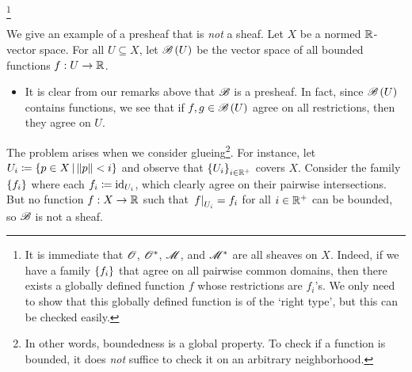 \documentclass[../Moduli_Spaces_of_Riemann_Surfaces.tex]{subfiles}
\begin{document}
    \footnote{It is immediate that $\mathscr{O}$, $\mathscr{O}^\ast$, $\mathscr{M}$, and $\mathscr{M}^\ast$ are all sheaves on $X$. Indeed, if we have a family $\left\{f_i\right\}$ that agree on all pairwise common domains, then there exists a globally defined function $f$ whose restrictions are $f_i$'s. We only need to show that this globally defined function is of the `right type', but this can be checked easily.}
    \vspace{-0.05in}
    \begin{example}
        We give an example of a presheaf that is \textit{not} a sheaf. Let $X$ be a normed $\mathbb{R}$-vector space. For all $U\subseteq X$, let $\mathscr{B}\left(U\right)$ be the vector space of all bounded functions $f:U\to\mathbb{R}$.
        \begin{itemize}
            \item It is clear from our remarks above that $\mathscr{B}$ is a presheaf. In fact, since $\mathscr{B}\left(U\right)$ contains functions, we see that if $f,g\in\mathscr{B}\left(U\right)$ agree on all restrictions, then they agree on $U$.
        \end{itemize}
        The problem arises when we consider glueing\footnote{In other words, boundedness is a global property. To check if a function is bounded, it does \textit{not} suffice to check it on an arbitrary neighborhood.}. For instance, let $U_i\coloneqq\left\{p\in X\,\middle\vert\,\left\|p\right\|<i\right\}$ and observe that $\left\{U_i\right\}_{i\in\mathbb{R}^+}$ covers $X$. Consider the family $\left\{f_i\right\}$ where each $f_i\coloneqq\operatorname{id}_{U_i}$, which clearly agree on their pairwise intersections. But no function $f:X\to\mathbb{R}$ such that $\left.f\right|_{U_i}=f_i$ for all $i\in\mathbb{R}^+$ can be bounded, so $\mathscr{B}$ is not a sheaf.\exqed
    \end{example}
\end{document}
